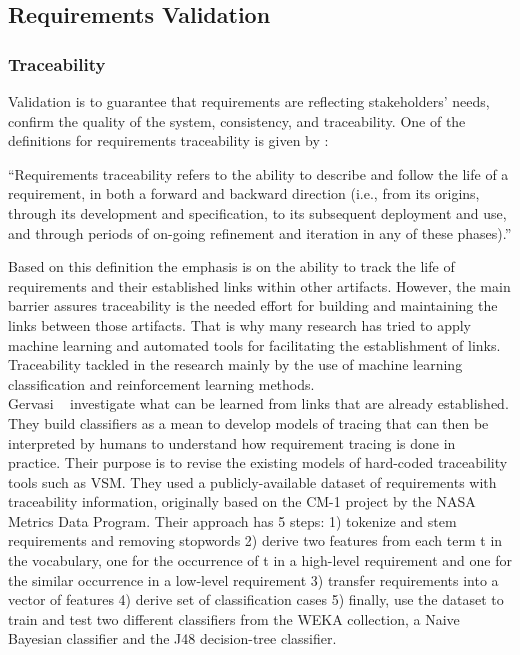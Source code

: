 \subsection{Requirements Validation}

\subsubsection{Traceability}

Validation is to guarantee that requirements are reflecting stakeholders' needs,
confirm the quality of the system, consistency, and traceability.
 One of the definitions for requirements traceability is given by
 \cite{Gotel:1994}:
\begin{displayquote} 
“Requirements traceability refers to the ability to describe and follow the life
of a requirement, in both a forward and backward direction (i.e., from its
origins, through its development and specification, to its subsequent deployment
and use, and through periods of on-going refinement and iteration in any of
these phases).”
\end{displayquote}
Based on this definition the emphasis is on the ability to track the life of
requirements and their established links within other artifacts. However, the
main barrier assures traceability is the needed effort for building and
maintaining the links between those artifacts. That is why many research has
tried to apply machine learning and automated tools for facilitating the
establishment of links\cite{Gervasi:2011}.
Traceability tackled in the research mainly by the use of machine learning
classification and reinforcement learning methods.\\

Gervasi \etal~\cite{Gervasi:2011} investigate what can be learned from links
that are already established. They build classifiers as a mean to develop models
of tracing that can then be interpreted by humans to understand how requirement
tracing is done in practice. Their purpose is to revise the existing models of
hard-coded traceability tools such as VSM.
They used a publicly-available dataset of requirements with traceability
information, originally based on the CM-1 project by the NASA Metrics Data
Program. Their approach has 5 steps: 1) tokenize and stem requirements and
removing stopwords 2) derive two features from each term t in the vocabulary,
one for the occurrence of t in a high-level requirement and one for the similar
occurrence in a low-level requirement 3) transfer requirements into a vector of
features 4) derive set of classification cases 5)
finally, use the dataset to train and test two different classifiers from the WEKA collection, a Naive
Bayesian classifier and the J48 decision-tree classifier.\newline

